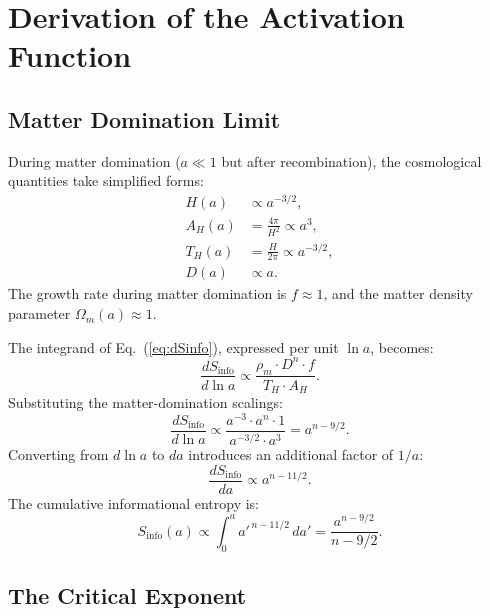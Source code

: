 \documentclass[twocolumn,a4paper,aps,prd,twocolumn,showpacs,notitlepage,superscriptaddress,nofootinbib]{article}
\begin{document}
\section{Derivation of the Activation Function}
\label{sec:activation}

\subsection{Matter Domination Limit}

During matter domination ($a \ll 1$ but after recombination), the
cosmological quantities take simplified forms:
\begin{align}
H(a) &\propto a^{-3/2}, \label{eq:H_matter}\\
A_H(a) &= \frac{4\pi}{H^2} \propto a^3, \label{eq:AH_matter}\\
T_H(a) &= \frac{H}{2\pi} \propto a^{-3/2}, \label{eq:TH_matter}\\
D(a) &\propto a. \label{eq:D_matter}
\end{align}
The growth rate during matter domination is $f \approx 1$, and the
matter density parameter $\Omega_m(a) \approx 1$.

The integrand of Eq.~(\ref{eq:dSinfo}), expressed per unit $\ln a$, becomes:
\begin{equation}
\label{eq:dSinfo}
\frac{dS_\mathrm{info}}{d\ln a} \propto
\frac{\rho_m \cdot D^n \cdot f}{T_H \cdot A_H}.
\end{equation}
Substituting the matter-domination scalings:
\begin{equation}
\frac{dS_\mathrm{info}}{d\ln a} \propto
\frac{a^{-3} \cdot a^n \cdot 1}{a^{-3/2} \cdot a^3} = a^{n - 9/2}.
\label{eq:scaling}
\end{equation}
Converting from $d\ln a$ to $da$ introduces an additional factor of $1/a$:
\begin{equation}
\frac{dS_\mathrm{info}}{da} \propto a^{n - 11/2}.
\end{equation}
The cumulative informational entropy is:
\begin{equation}
S_\mathrm{info}(a) \propto \int_0^a a'^{\,n - 11/2}\,da'
= \frac{a^{n-9/2}}{n - 9/2}.
\label{eq:integral}
\end{equation}

\subsection{The Critical Exponent}
\end{document}
